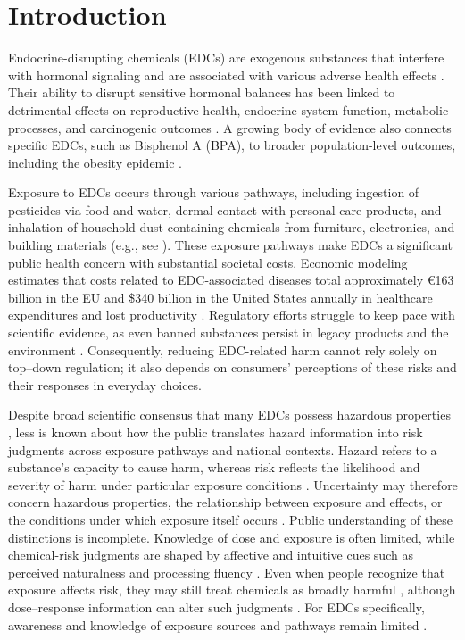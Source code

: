 \section{Introduction}
Endocrine-disrupting chemicals (EDCs) are exogenous substances that interfere with hormonal signaling and are associated with various adverse health effects \citep{la2020consensus}. Their ability to disrupt sensitive hormonal balances has been linked to detrimental effects on reproductive health, endocrine system function, metabolic processes, and carcinogenic outcomes \citep{gore2015executive}. A growing body of evidence also connects specific EDCs, such as Bisphenol A (BPA), to broader population-level outcomes, including the obesity epidemic \citep{heindel2022obesity}.

Exposure to EDCs occurs through various pathways, including ingestion of pesticides via food and water, dermal contact with personal care products, and inhalation of household dust containing chemicals from furniture, electronics, and building materials (e.g., see \cite{rudel2011environmental, dodson2012endocrine}). These exposure pathways make EDCs a significant public health concern with substantial societal costs. 
Economic modeling estimates that costs related to EDC-associated diseases total approximately €163 billion in the EU and \$340 billion in the United States annually in healthcare expenditures and lost productivity \citep{kassotis2020endocrine}. Regulatory efforts struggle to keep pace with scientific evidence, as even banned substances persist in legacy products and the environment \citep{sogaard2021test}. Consequently, reducing EDC-related harm cannot rely solely on top--down regulation; it also depends on consumers' perceptions of these risks and their responses in everyday choices.

Despite broad scientific consensus that many EDCs possess hazardous properties \citep{la2020consensus}, less is known about how the public translates hazard information into risk judgments across exposure pathways and national contexts. Hazard refers to a substance's capacity to cause harm, whereas risk reflects the likelihood and severity of harm under particular exposure conditions \citep{WHO2021}. Uncertainty may therefore concern hazardous properties, the relationship between exposure and effects, or the conditions under which exposure itself occurs \citep{jansen2018breaking}. Public understanding of these distinctions is incomplete. Knowledge of dose and exposure is often limited, while chemical-risk judgments are shaped by affective and intuitive cues such as perceived naturalness and processing fluency \citep{bearth2019lay,saleh2019chemophobia,song2009}. Even when people recognize that exposure affects risk, they may still treat chemicals as broadly harmful \citep{jansen2020all}, although dose--response information can alter such judgments \citep{bearth2021chemophobia}. For EDCs specifically, awareness and knowledge of exposure sources and pathways remain limited \citep{boronow2025people}.

